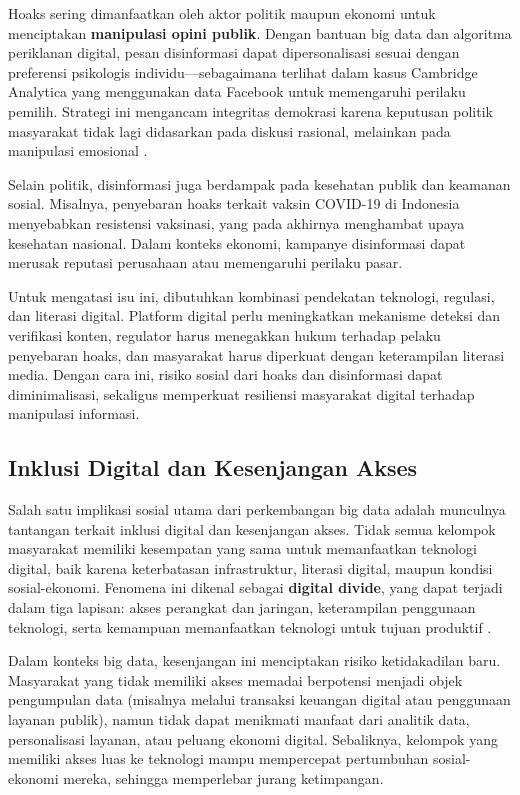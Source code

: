 Hoaks sering dimanfaatkan oleh aktor politik maupun ekonomi untuk menciptakan \textbf{manipulasi opini publik}. Dengan bantuan big data dan algoritma periklanan digital, pesan disinformasi dapat dipersonalisasi sesuai dengan preferensi psikologis individu—sebagaimana terlihat dalam kasus Cambridge Analytica yang menggunakan data Facebook untuk memengaruhi perilaku pemilih. Strategi ini mengancam integritas demokrasi karena keputusan politik masyarakat tidak lagi didasarkan pada diskusi rasional, melainkan pada manipulasi emosional \cite{tufekci2015}.  

Selain politik, disinformasi juga berdampak pada kesehatan publik dan keamanan sosial. Misalnya, penyebaran hoaks terkait vaksin COVID-19 di Indonesia menyebabkan resistensi vaksinasi, yang pada akhirnya menghambat upaya kesehatan nasional. Dalam konteks ekonomi, kampanye disinformasi dapat merusak reputasi perusahaan atau memengaruhi perilaku pasar.  

Untuk mengatasi isu ini, dibutuhkan kombinasi pendekatan teknologi, regulasi, dan literasi digital. Platform digital perlu meningkatkan mekanisme deteksi dan verifikasi konten, regulator harus menegakkan hukum terhadap pelaku penyebaran hoaks, dan masyarakat harus diperkuat dengan keterampilan literasi media. Dengan cara ini, risiko sosial dari hoaks dan disinformasi dapat diminimalisasi, sekaligus memperkuat resiliensi masyarakat digital terhadap manipulasi informasi.

\subsection{Inklusi Digital dan Kesenjangan Akses}

Salah satu implikasi sosial utama dari perkembangan big data adalah munculnya tantangan terkait inklusi digital dan kesenjangan akses. Tidak semua kelompok masyarakat memiliki kesempatan yang sama untuk memanfaatkan teknologi digital, baik karena keterbatasan infrastruktur, literasi digital, maupun kondisi sosial-ekonomi. Fenomena ini dikenal sebagai \textbf{digital divide}, yang dapat terjadi dalam tiga lapisan: akses perangkat dan jaringan, keterampilan penggunaan teknologi, serta kemampuan memanfaatkan teknologi untuk tujuan produktif \cite{hilbert2011digital}.  

Dalam konteks big data, kesenjangan ini menciptakan risiko ketidakadilan baru. Masyarakat yang tidak memiliki akses memadai berpotensi menjadi objek pengumpulan data (misalnya melalui transaksi keuangan digital atau penggunaan layanan publik), namun tidak dapat menikmati manfaat dari analitik data, personalisasi layanan, atau peluang ekonomi digital. Sebaliknya, kelompok yang memiliki akses luas ke teknologi mampu mempercepat pertumbuhan sosial-ekonomi mereka, sehingga memperlebar jurang ketimpangan.  

